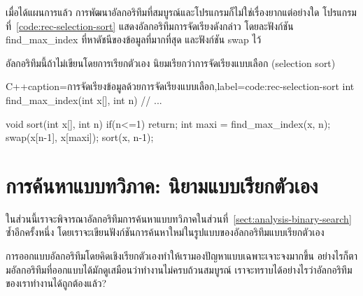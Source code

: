 เมื่อ{\wbr}ได้{\wbr}แผนการ{\wbr}แล้ว การ{\wbr}พัฒนา{\wbr}อัล{\wbr}กอ{\wbr}ริ{\wbr}ทึม{\wbr}ที่{\wbr}สมบูรณ์{\wbr}และ{\wbr}โปรแกรม{\wbr}ก็{\wbr}ไม่{\wbr}ใช่{\wbr}เรื่อง{\wbr}ยาก{\wbr}แต่อย่างใด{\wbr}
โปรแกรม{\wbr}ที่~\ref{code:rec-selection-sort} แสดง{\wbr}อัล{\wbr}กอ{\wbr}ริ{\wbr}ทึม{\wbr}การ{\wbr}จัดเรียง{\wbr}ดังกล่าว{\wbr}
โดย{\wbr}ละ{\wbr}ฟังก์ชัน {\ct find\_max\_index} ที่{\wbr}หา{\wbr}ดัชนี{\wbr}ของ{\wbr}ข้อมูล{\wbr}ที่{\wbr}มาก{\wbr}ที่สุด และ{\wbr}ฟังก์ชัน {\ct
  swap} ไว้{\wbr}

อัล{\wbr}กอ{\wbr}ริ{\wbr}ทึม{\wbr}นี้{\wbr}ถ้า{\wbr}ไม่{\wbr}เขียน{\wbr}โดย{\wbr}การ{\wbr}เรียก{\wbr}ตัวเอง นิยม{\wbr}เรียก{\wbr}ว่า{\wbr}การ{\wbr}จัดเรียง{\wbr}แบบ{\wbr}เลือก (selection
sort)

\latintext
\begin{codelist}{C++}{caption={\thaitext การ{\wbr}จัดเรียง{\wbr}ข้อมูล{\wbr}ด้วย{\wbr}การ{\wbr}จัดเรียง{\wbr}แบบ{\wbr}เลือก\latintext},label=code:rec-selection-sort}
int find_max_index(int x[], int n) { // ... }

void sort(int x[], int n)
{
  if(n<=1)
    return;
  int maxi = find_max_index(x, n);
  swap(x[n-1], x[maxi]);
  sort(x, n-1);
}
\end{codelist}
\thaitext

\section{การ{\wbr}ค้นหา{\wbr}แบบ{\wbr}ทวิภาค: นิยาม{\wbr}แบบ{\wbr}เรียก{\wbr}ตัวเอง}
\label{sect:rec-binary-search-revisited}

ใน{\wbr}ส่วน{\wbr}นี้{\wbr}เรา{\wbr}จะ{\wbr}พิจารณา{\wbr}อัล{\wbr}กอ{\wbr}ริ{\wbr}ทึม{\wbr}การ{\wbr}ค้นหา{\wbr}แบบ{\wbr}ทวิภาค{\wbr}ใน{\wbr}ส่วน{\wbr}ที่~\ref{sect:analysis-binary-search}
ซ้ำ{\wbr}อีก{\wbr}ครั้ง{\wbr}หนึ่ง โดย{\wbr}เรา{\wbr}จะ{\wbr}เขียน{\wbr}ฟังก์ชัน{\wbr}การ{\wbr}ค้นหา{\wbr}ใหม่{\wbr}ใน{\wbr}รูปแบบ{\wbr}ของ{\wbr}อัล{\wbr}กอ{\wbr}ริ{\wbr}ทึม{\wbr}แบบ{\wbr}เรียก{\wbr}ตัวเอง{\wbr}

การ{\wbr}ออกแบบ{\wbr}อัล{\wbr}กอ{\wbr}ริ{\wbr}ทึม{\wbr}โดย{\wbr}คิด{\wbr}เชิง{\wbr}เรียก{\wbr}ตัวเอง{\wbr}ทำ{\wbr}ให้{\wbr}เรา{\wbr}มอง{\wbr}ปัญหา{\wbr}แบบ{\wbr}เฉพาะเจาะจง{\wbr}มาก{\wbr}ขึ้น{\wbr}
อย่างไรก็ตาม{\wbr}อัล{\wbr}กอ{\wbr}ริ{\wbr}ทึม{\wbr}ที่{\wbr}ออกแบบ{\wbr}ได้{\wbr}มัก{\wbr}ดู{\wbr}เสมือน{\wbr}ว่า{\wbr}ทำงาน{\wbr}ไม่{\wbr}ครบถ้วน{\wbr}สมบูรณ์{\wbr}
เรา{\wbr}จะ{\wbr}ทราบ{\wbr}ได้{\wbr}อย่างไร{\wbr}ว่า{\wbr}อัล{\wbr}กอ{\wbr}ริ{\wbr}ทึม{\wbr}ของ{\wbr}เรา{\wbr}ทำงาน{\wbr}ได้{\wbr}ถูกต้อง{\wbr}แล้ว?

